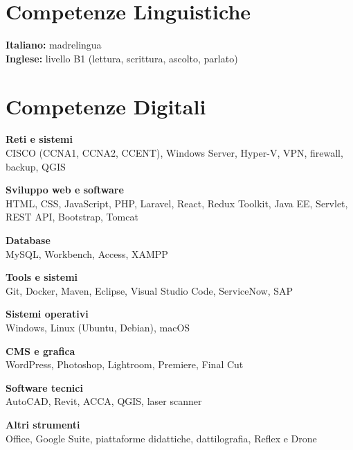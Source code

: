 \documentclass[a4paper,10pt]{article}
\begin{document}
\hrulefill

\section*{\faLanguage \quad Competenze Linguistiche}
\textbf{Italiano:} madrelingua\\
\textbf{Inglese:} livello B1 (lettura, scrittura, ascolto, parlato)

\hrulefill

\section*{\faCode \quad Competenze Digitali}
\begin{multicols}{2}
\textbf{\textcolor{mainblue}{Reti e sistemi}}\\
CISCO (CCNA1, CCNA2, CCENT), Windows Server, Hyper-V, VPN, firewall, backup, QGIS

\textbf{\textcolor{mainblue}{Sviluppo web e software}}\\
HTML, CSS, JavaScript, PHP, Laravel, React, Redux Toolkit, Java EE, Servlet, REST API, Bootstrap, Tomcat

\textbf{\textcolor{mainblue}{Database}}\\
MySQL, Workbench, Access, XAMPP

\textbf{\textcolor{mainblue}{Tools e sistemi}}\\
Git, Docker, Maven, Eclipse, Visual Studio Code, ServiceNow, SAP

\textbf{\textcolor{mainblue}{Sistemi operativi}}\\
Windows, Linux (Ubuntu, Debian), macOS

\textbf{\textcolor{mainblue}{CMS e grafica}}\\
WordPress, Photoshop, Lightroom, Premiere, Final Cut

\textbf{\textcolor{mainblue}{Software tecnici}}\\
AutoCAD, Revit, ACCA, QGIS, laser scanner

\textbf{\textcolor{mainblue}{Altri strumenti}}\\
Office, Google Suite, piattaforme didattiche, dattilografia, Reflex e Drone
\end{multicols}

\hrulefill

\end{document}
